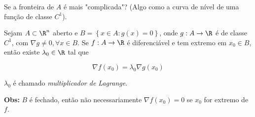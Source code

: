 \documentclass{book}
\begin{document}
\begin{sol}
\end{sol}

Se a fronteira de $A$ \'e mais "complicada"? (Algo como a curva de n\'ivel de uma fun\c c\~ao de classe $C^1$).

\begin{teo}
    Sejam $A \subset \R^n$ aberto e $B = \left\{ {x \in A:g\left( x \right) = 0} \right\}$, onde $g:A \to \R$ \'e de classe $C^1$, com $\nabla g \ne 0,\forall x \in B$. Se $f:A \to \R$ \'e diferenci\'avel e tem extremo em $x_0  \in B$, ent\~ao existe $\lambda_0 \in \R$ tal que

\[
\nabla f\left( {x_0 } \right) = \lambda _0 \nabla g\left( {x_0 } \right)
\]

$\lambda _0$ \'e chamado \textit{multiplicador de Lagrange}.

    \textbf{Obs:} $B$ \'e fechado, ent\~ao n\~ao necessariamente $\nabla f\left( {x_0 } \right) = 0$ se $x_0$ for extremo de $f$.

\end{teo}
\end{document}
